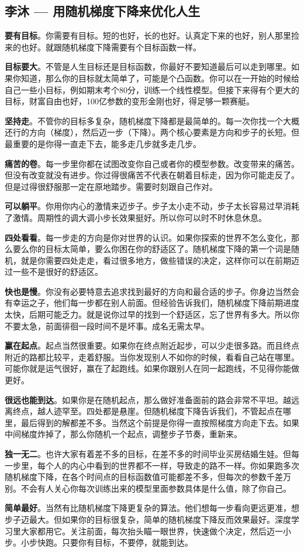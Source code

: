\subsection{李沐 --- 用随机梯度下降来优化人生}
\textbf{要有目标}。你需要有目标。短的也好，长的也好。认真定下来的也好，别人那里捡来的也好。就跟随机梯度下降需要有个目标函数一样。

\textbf{目标要大}。不管是人生目标还是目标函数，你最好不要知道最后可以走到哪里。如果你知道，那么你的目标就太简单了，可能是个凸函数。你可以在一开始的时候给自己一些小目标，例如期末考个80分，训练一个线性模型。但接下来得有个更大的目标，财富自由也好，100亿参数的变形金刚也好，得足够一颗赛艇。

\textbf{坚持走}。不管你的目标多复杂，随机梯度下降都是最简单的。每一次你找一个大概还行的方向（梯度），然后迈一步（下降）。两个核心要素是方向和步子的长短。但最重要的是你得一直走下去，能多走几步就多走几步。

\textbf{痛苦的卷}。每一步里你都在试图改变你自己或者你的模型参数。改变带来的痛苦。但没有改变就没有进步。你过得很痛苦不代表在朝着目标走，因为你可能走反了。但是过得很舒服那一定在原地踏步。需要时刻跟自己作对。

\textbf{可以躺平}。你用你内心的激情来迈步子。步子太小走不动，步子太长容易过早消耗了激情。周期性的调大调小步长效果挺好。所以你可以时不时休息休息。

\textbf{四处看看}。每一步走的方向是你对世界的认识。如果你探索的世界不怎么变化，那么要么你的目标太简单，要么你困在你的舒适区了。随机梯度下降的第一个词是随机，就是你需要四处走走，看过很多地方，做些错误的决定，这样你可以在前期迈过一些不是很好的舒适区。

\textbf{快也是慢}。你没有必要特意去追求找到最好的方向和最合适的步子。你身边当然会有幸运之子，他们每一步都在别人前面。但经验告诉我们，随机梯度下降前期进度太快，后期可能乏力。就是说你过早的找到一个舒适区，忘了世界有多大。所以你不要太急，前面徘徊一段时间不是坏事。成名无需太早。

\textbf{赢在起点}。起点当然很重要。如果你在终点附近起步，可以少走很多路。而且终点附近的路都比较平，走着舒服。当你发现别人不如你的时候，看看自己站在哪里。可能你就是运气很好，赢在了起跑线。如果你跟别人在同一起跑线，不见得你能做更好。

\textbf{很远也能到达}。如果你是在随机起点，那么做好准备面前的路会非常不平坦。越远离终点，越人迹罕至。四处都是悬崖。但随机梯度下降告诉我们，不管起点在哪里，最后得到的解都差不多。当然这个前提是你得一直按照梯度方向走下去。如果中间梯度炸掉了，那么你随机一个起点，调整步子节奏，重新来。

\textbf{独一无二}。也许大家有着差不多的目标，在差不多的时间毕业买房结婚生娃。但每一步里，每个人的内心中看到的世界都不一样，导致走的路不一样。你如果跑多次随机梯度下降，在各个时间点的目标函数值可能都差不多，但每次的参数千差万别。不会有人关心你每次训练出来的模型里面参数具体是什么值，除了你自己。

\textbf{简单最好}。当然有比随机梯度下降更复杂的算法。他们想每一步看向更远更准，想步子迈最大。但如果你的目标很复杂，简单的随机梯度下降反而效果最好。深度学习里大家都用它。关注前面，每次抬头瞄一眼世界，快速做个决定，然后迈一小步。小步快跑。只要你有目标，不要停，就能到达。
